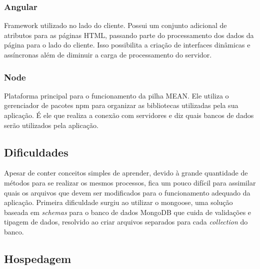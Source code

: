 \documentclass[
	12pt,				%
	oneside,			%
	a4paper,			%
	brazil				%
]{abntex2}
\begin{document}
\subsubsection{Angular}

Framework utilizado no lado do cliente. Possui um conjunto adicional de atributos para as páginas HTML, passando parte do processamento dos dados da página para o lado do cliente. Isso possibilita a criação de interfaces dinâmicas e assíncronas além de diminuir a carga de processamento do servidor.


\subsubsection{Node}

Plataforma principal para o funcionamento da pilha MEAN. Ele utiliza o gerenciador de pacotes npm para organizar as bibliotecas utilizadas pela sua aplicação. É ele que realiza a conexão com servidores e diz quais bancos de dados serão utilizados pela aplicação.


\subsection{Dificuldades}

Apesar de conter conceitos simples de aprender, devido à grande quantidade de métodos para se realizar os mesmos processos, fica um pouco difícil para assimilar quais os arquivos que devem ser modificados para o funcionamento adequado da aplicação.
Primeira dificuldade surgiu ao utilizar o mongoose, uma solução baseada em \textit{schemas} para o banco de dados MongoDB que cuida de validações e tipagem de dados, resolvido ao criar arquivos separados para cada \textit{collection} do banco.


\subsection{Hospedagem}
\end{document}
